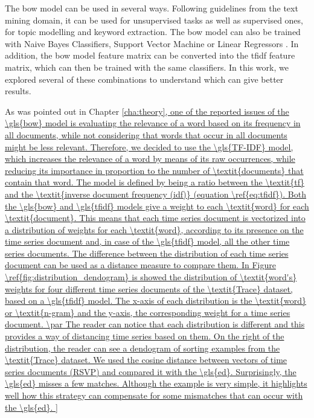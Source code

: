 The \gls{bow} model can be used in several ways. Following guidelines from the text mining domain, it can be used for unsupervised tasks as well as supervised ones, for topic modelling and keyword extraction. The \gls{bow} model can also be trained with Naive Bayes Classifiers, Support Vector Machine or Linear Regressors \cite{scikit-learn}. In addition, the \gls{bow} model feature matrix can be converted into the \gls{tfidf} feature matrix, which can then be trained with the same classifiers. In this work, we explored several of these combinations to understand which can give better results.
\par
As was pointed out in Chapter \ref{cha:theory], one of the reported issues of the \gls{bow} model is evaluating the relevance of a word based on its frequency in all documents, while not considering that words that occur in all documents might be less relevant. Therefore, we decided to use the \gls{TF-IDF} model, which increases the relevance of a word by means of its raw occurrences, while reducing its importance in proportion to the number of \textit{documents} that contain that word. The model is defined by being a ratio between the \textit{tf} and the \textit{inverse document frequency (idf)} (equation \ref{eq:tfidf}).

Both the \gls{bow} and \gls{tfidf} models give a weight to each \textit{word} for each \textit{document}. This means that each time series document is vectorized into a distribution of weights for each \textit{word}, according to its presence on the time series document and, in case of the \gls{tfidf} model, all the other time series documents. The difference between the distribution of each time series document can be used as a distance measure to compare them. In Figure \ref{fig:distribution_dendogram} is showed the distribution of \textit{word's} weights for four different time series documents of the \textit{Trace} dataset, based on a \gls{tfidf} model. The x-axis of each distribution is the \textit{word} or \textit{n-gram} and the y-axis, the corresponding weight for a time series document.
\par
The reader can notice that each distribution is different and this provides a way of distancing time series based on them. On the right of the distribution, the reader can see a dendogram of sorting examples from the \textit{Trace} dataset. We used the cosine distance between vectors of time series documents (RSVP) and compared it with the \gls{ed}. Surprisingly, the \gls{ed} misses a few matches. Although the example is very simple, it highlights well how this strategy can compensate for some mismatches that can occur with the \gls{ed}.

}
